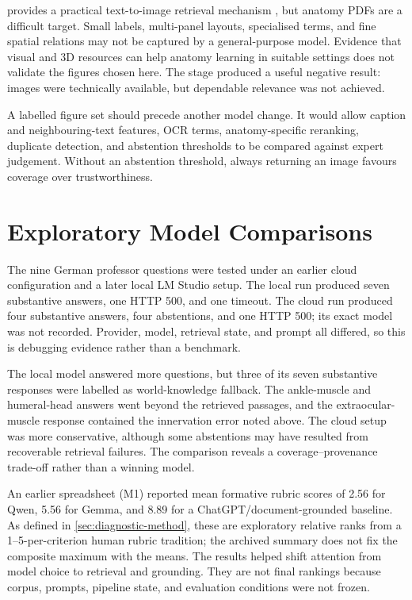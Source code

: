 \CLIP{} provides a practical text-to-image retrieval mechanism \parencite{radford2021}, but anatomy PDFs are a difficult target. Small labels, multi-panel layouts, specialised terms, and fine spatial relations may not be captured by a general-purpose model. Evidence that visual and 3D resources can help anatomy learning in suitable settings \parencite{yammine2015,moro2017} does not validate the figures chosen here. The stage produced a useful negative result: images were technically available, but dependable relevance was not achieved.

A labelled figure set should precede another model change. It would allow caption and neighbouring-text features, OCR terms, anatomy-specific reranking, duplicate detection, and abstention thresholds to be compared against expert judgement. Without an abstention threshold, always returning an image favours coverage over trustworthiness.

\section{Exploratory Model Comparisons}
\label{sec:model-comparisons}

The nine German professor questions were tested under an earlier cloud configuration and a later local LM Studio setup. The local run produced seven substantive answers, one HTTP 500, and one timeout. The cloud run produced four substantive answers, four abstentions, and one HTTP 500; its exact model was not recorded. Provider, model, retrieval state, and prompt all differed, so this is debugging evidence rather than a benchmark.

The local model answered more questions, but three of its seven substantive responses were labelled as world-knowledge fallback. The ankle-muscle and humeral-head answers went beyond the retrieved passages, and the extraocular-muscle response contained the innervation error noted above. The cloud setup was more conservative, although some abstentions may have resulted from recoverable retrieval failures. The comparison reveals a coverage--provenance trade-off rather than a winning model.

An earlier spreadsheet (M1) reported mean formative rubric scores of 2.56 for Qwen, 5.56 for Gemma, and 8.89 for a ChatGPT/document-grounded baseline. As defined in \cref{sec:diagnostic-method}, these are exploratory relative ranks from a 1--5-per-criterion human rubric tradition; the archived summary does not fix the composite maximum with the means. The results helped shift attention from model choice to retrieval and grounding. They are not final rankings because corpus, prompts, pipeline state, and evaluation conditions were not frozen.

